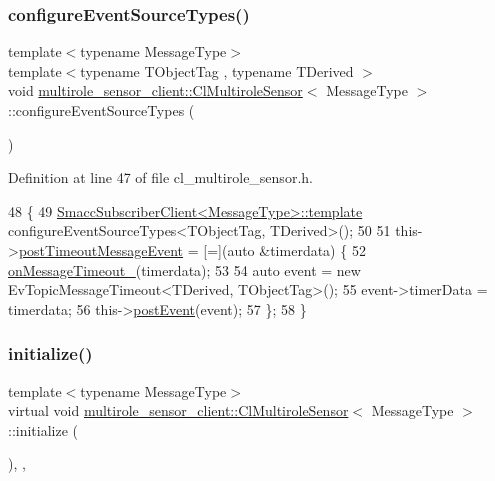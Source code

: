 \subsubsection{\texorpdfstring{configure\+Event\+Source\+Types()}{configureEventSourceTypes()}}
{\footnotesize\ttfamily template$<$typename Message\+Type$>$ \\
template$<$typename T\+Object\+Tag , typename T\+Derived $>$ \\
void \hyperlink{classmultirole__sensor__client_1_1ClMultiroleSensor}{multirole\+\_\+sensor\+\_\+client\+::\+Cl\+Multirole\+Sensor}$<$ Message\+Type $>$\+::configure\+Event\+Source\+Types (\begin{DoxyParamCaption}{ }\end{DoxyParamCaption})\hspace{0.3cm}{\ttfamily [inline]}}



Definition at line 47 of file cl\+\_\+multirole\+\_\+sensor.\+h.


\begin{DoxyCode}
48   \{
49     \hyperlink{classsmacc_1_1client__bases_1_1SmaccSubscriberClient}{SmaccSubscriberClient<MessageType>::template} 
      configureEventSourceTypes<TObjectTag, TDerived>();
50 
51     this->\hyperlink{classmultirole__sensor__client_1_1ClMultiroleSensor_a7453ad95c3b9bdffd4184e2d99cd0967}{postTimeoutMessageEvent} = [=](\textcolor{keyword}{auto} &timerdata) \{
52       \hyperlink{classmultirole__sensor__client_1_1ClMultiroleSensor_a1bc88382c36abae583a7c946cfe10ace}{onMessageTimeout\_}(timerdata);
53 
54       \textcolor{keyword}{auto} \textcolor{keyword}{event} = \textcolor{keyword}{new} EvTopicMessageTimeout<TDerived, TObjectTag>();
55       \textcolor{keyword}{event}->timerData = timerdata;
56       this->\hyperlink{classsmacc_1_1ISmaccClient_a21a79203cb44fc717d4d977c190327c6}{postEvent}(event);
57     \};
58   \}
\end{DoxyCode}
\mbox{\label{classmultirole__sensor__client_1_1ClMultiroleSensor_a8cd8e9766dd4e0f4d3be69d7979c5e50}} 
\subsubsection{\texorpdfstring{initialize()}{initialize()}}
{\footnotesize\ttfamily template$<$typename Message\+Type$>$ \\
virtual void \hyperlink{classmultirole__sensor__client_1_1ClMultiroleSensor}{multirole\+\_\+sensor\+\_\+client\+::\+Cl\+Multirole\+Sensor}$<$ Message\+Type $>$\+::initialize (\begin{DoxyParamCaption}{ }\end{DoxyParamCaption})\hspace{0.3cm}{\ttfamily [inline]}, {\ttfamily [override]}, {\ttfamily [virtual]}}



